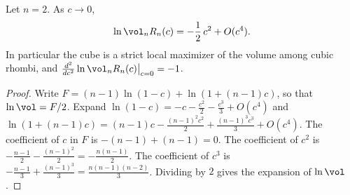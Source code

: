 \begin{theorem}\label{thm:main}
Let $n=2$. As $c\to0$,
\[
\ln\vol_nR_n(c)=- \frac{1}{2}\,c^2+O(c^4).
\]
In particular the cube is a strict local maximizer of the volume among cubic rhombi, and $\frac{d^2}{dc^2}\ln\vol_nR_n(c)\big|_{c=0}=-1$.
\end{theorem}
\begin{proof}
Write $F=(n-1)\ln(1-c)+\ln(1+(n-1)c)$, so that $\ln\vol=F/2$.
Expand $\ln(1-c)=-c-\frac{c^2}{2}-\frac{c^3}{3}+O(c^4)$ and $\ln(1+(n-1)c)=(n-1)c-\frac{(n-1)^2c^2}{2}+\frac{(n-1)^3c^3}{3}+O(c^4)$.
The coefficient of $c$ in $F$ is $-(n-1)+(n-1)=0$.
The coefficient of $c^2$ is $-\frac{n-1}{2}-\frac{(n-1)^2}{2}=-\frac{n(n-1)}{2}$.
The coefficient of $c^3$ is $-\frac{n-1}{3}+\frac{(n-1)^3}{3}=\frac{n(n-1)(n-2)}{3}$.
Dividing by $2$ gives the expansion of $\ln\vol$.
\end{proof}
